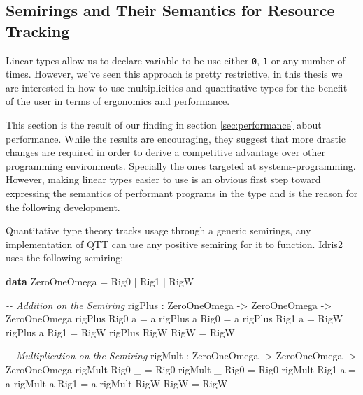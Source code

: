 \documentclass[
]{article}
\newenvironment{Shaded}{}{}
\newcommand{\CommentTok}[1]{\textcolor[rgb]{0.38,0.63,0.69}{\textit{#1}}}
\newcommand{\DataTypeTok}[1]{\textcolor[rgb]{0.56,0.13,0.00}{#1}}
\newcommand{\KeywordTok}[1]{\textcolor[rgb]{0.00,0.44,0.13}{\textbf{#1}}}
\newcommand{\NormalTok}[1]{#1}
\newcommand{\OperatorTok}[1]{\textcolor[rgb]{0.40,0.40,0.40}{#1}}
\newcommand{\OtherTok}[1]{\textcolor[rgb]{0.00,0.44,0.13}{#1}}
\begin{document}
\hypertarget{semirings-and-their-semantics-for-resource-tracking}{%
\subsection{Semirings and Their Semantics for Resource
Tracking}\label{semirings-and-their-semantics-for-resource-tracking}}

\label{subsec:semiring-semantics}

Linear types allow us to declare variable to be use either \texttt{0},
\texttt{1} or any number of times. However, we've seen this approach is
pretty restrictive, in this thesis we are interested in how to use
multiplicities and quantitative types for the benefit of the user in
terms of ergonomics and performance.

This section is the result of our finding in section
\ref{sec:performance} about performance. While the results are
encouraging, they suggest that more drastic changes are required in
order to derive a competitive advantage over other programming
environments. Specially the ones targeted at systems-programming.
However, making linear types easier to use is an obvious first step
toward expressing the semantics of performant programs in the type and
is the reason for the following development.

Quantitative type theory tracks usage through a generic semirings, any
implementation of QTT can use any positive semiring for it to function.
Idris2 uses the following semiring:

\begin{Shaded}
\begin{Highlighting}[]
\KeywordTok{data} \DataTypeTok{ZeroOneOmega} \OtherTok{=} \DataTypeTok{Rig0} \OperatorTok{|} \DataTypeTok{Rig1} \OperatorTok{|} \DataTypeTok{RigW}

\CommentTok{{-}{-} Addition on the Semiring}
\NormalTok{rigPlus }\OperatorTok{:} \DataTypeTok{ZeroOneOmega} \OtherTok{{-}\textgreater{}} \DataTypeTok{ZeroOneOmega} \OtherTok{{-}\textgreater{}} \DataTypeTok{ZeroOneOmega}
\NormalTok{rigPlus }\DataTypeTok{Rig0}\NormalTok{ a }\OtherTok{=}\NormalTok{ a}
\NormalTok{rigPlus a }\DataTypeTok{Rig0} \OtherTok{=}\NormalTok{ a}
\NormalTok{rigPlus }\DataTypeTok{Rig1}\NormalTok{ a }\OtherTok{=} \DataTypeTok{RigW}
\NormalTok{rigPlus a }\DataTypeTok{Rig1} \OtherTok{=} \DataTypeTok{RigW}
\NormalTok{rigPlus }\DataTypeTok{RigW} \DataTypeTok{RigW} \OtherTok{=} \DataTypeTok{RigW}

\CommentTok{{-}{-} Multiplication on the Semiring}
\NormalTok{rigMult }\OperatorTok{:} \DataTypeTok{ZeroOneOmega} \OtherTok{{-}\textgreater{}} \DataTypeTok{ZeroOneOmega} \OtherTok{{-}\textgreater{}} \DataTypeTok{ZeroOneOmega}
\NormalTok{rigMult }\DataTypeTok{Rig0}\NormalTok{ \_ }\OtherTok{=} \DataTypeTok{Rig0}
\NormalTok{rigMult \_ }\DataTypeTok{Rig0} \OtherTok{=} \DataTypeTok{Rig0}
\NormalTok{rigMult }\DataTypeTok{Rig1}\NormalTok{ a }\OtherTok{=}\NormalTok{ a}
\NormalTok{rigMult a }\DataTypeTok{Rig1} \OtherTok{=}\NormalTok{ a}
\NormalTok{rigMult }\DataTypeTok{RigW} \DataTypeTok{RigW} \OtherTok{=} \DataTypeTok{RigW}
\end{Highlighting}
\end{Shaded}
\end{document}
